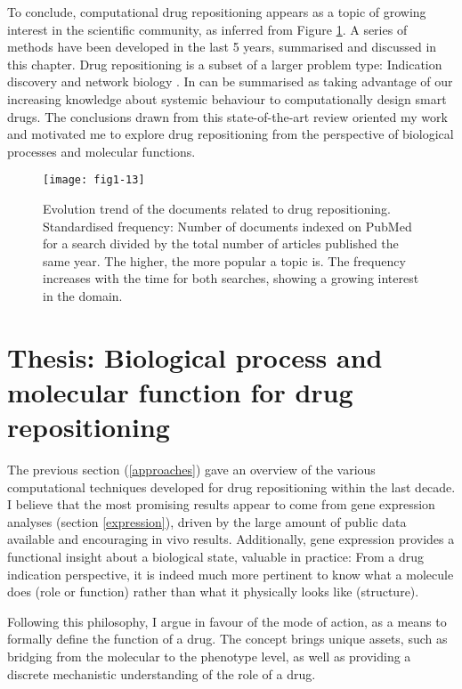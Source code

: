 To conclude, computational drug repositioning appears as a topic of growing interest in the scientific community, as inferred from Figure \ref{fig1-13}. A series of methods have been developed in the last 5 years, summarised and discussed in this chapter. Drug repositioning is a subset of a larger problem type: Indication discovery and network biology \citep{hopkins2008network}. In can be summarised as taking advantage of our increasing knowledge about systemic behaviour to computationally design smart drugs.
The conclusions drawn from this state-of-the-art review oriented my work and motivated me to explore drug repositioning from the perspective of biological processes and molecular functions.

\begin{figure}[ht]
    \centering
    \texttt{[image: fig1-13]}
    \caption{Evolution trend of the documents related to drug repositioning. Standardised frequency: Number of documents indexed on PubMed for a search divided by the total number of articles published the same year. The higher, the more popular a topic is. The  frequency increases with the time for both searches, showing a growing interest in the domain.}
    \label{fig1-13}
\end{figure}


\section{Thesis: Biological process and molecular function for drug repositioning}

The previous section (\ref{approaches}) gave an overview of the various computational techniques developed for drug repositioning within the last decade. I believe that the most promising results appear to come from gene expression analyses (section \ref{expression}), driven by the large amount of public data available and encouraging in vivo results. Additionally, gene expression provides a functional insight about a biological state, valuable in practice: From a drug indication perspective, it is indeed much more pertinent to know what a molecule does (role or function) rather than what it physically looks like (structure).

Following this philosophy, I argue in favour of the mode of action, as a means to formally define the function of a drug. The concept brings unique assets, such as bridging from the molecular to the phenotype level, as well as providing a discrete mechanistic understanding of the role of a drug.

